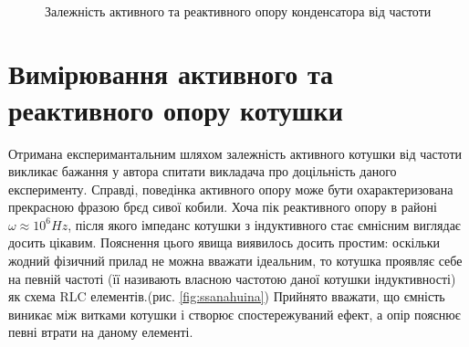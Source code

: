 \begin{figure}[h]
\begin{minipage}[h]{0.47\linewidth}
    \end{minipage}
    \vfill
    \begin{minipage}[h]{0.47\linewidth}
        \\
    \end{minipage}
    \caption{Залежність активного та реактивного опору конденсатора від частоти}
    \label{fig:part22}
\end{figure}

\section{Вимірювання активного та реактивного опору котушки}

Отримана експеримантальним шляхом залежність активного котушки від частоти викликає бажання у автора спитати викладача про доцільність даного експерименту. Справді, поведінка активного опору може бути охарактеризована прекрасною фразою брєд сивої кобили. Хоча пік реактивного опору в районі $\omega \approx 10^6 Hz$, після якого імпеданс котушки з індуктивного стає ємнісним виглядає досить цікавим. Пояснення цього явища виявилось досить простим: оскільки жодний фізичний прилад не можна вважати ідеальним, то котушка проявляє себе на певній частоті (її називають власною частотою даної котушки індуктивності) як схема RLC елементів.(рис. \ref{fig:ssanahuina}) Прийнято вважати, що ємність виникає між витками котушки і створює спостережуваний ефект, а опір пояснює певні втрати на даному елементі.\cite{huina}

